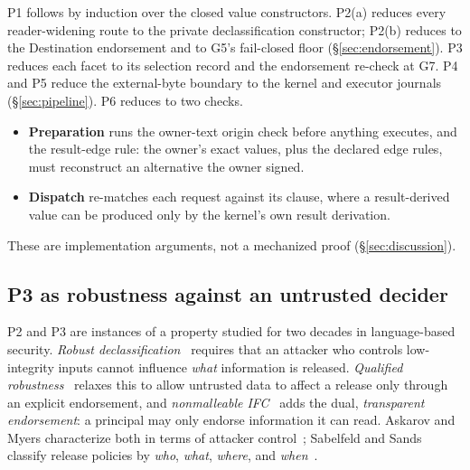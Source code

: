 \documentclass[letterpaper,twocolumn,10pt]{article}
\begin{document}
P1 follows by induction over the closed value constructors. P2(a) reduces
every reader-widening route to the private declassification constructor;
P2(b) reduces to the \textsf{Destination} endorsement and to G5's
fail-closed floor (\S\ref{sec:endorsement}).
P3 reduces each facet to its selection record and the endorsement re-check
at G7. P4 and P5 reduce the external-byte boundary to the kernel and
executor journals (\S\ref{sec:pipeline}). P6 reduces to two checks.
\begin{itemize}
\item \textbf{Preparation} runs the owner-text origin check before
  anything executes, and the result-edge rule: the owner's exact values,
  plus the declared edge rules, must reconstruct an alternative the owner
  signed.
\item \textbf{Dispatch} re-matches each request against its clause, where
  a result-derived value can be produced only by the kernel's own result
  derivation.
\end{itemize}
These are implementation arguments, not a mechanized proof
(\S\ref{sec:discussion}).

\subsection{P3 as robustness against an untrusted decider}
\label{sec:robustness}

P2 and P3 are instances of a property studied for two decades in
language-based security. \emph{Robust declassification}~\cite{zdancewic2001robust}
requires that an attacker who controls low-integrity inputs cannot
influence \emph{what} information is released. \emph{Qualified
robustness}~\cite{myers2006qualified} relaxes this to allow untrusted data to
affect a release only through an explicit endorsement, and
\emph{nonmalleable IFC}~\cite{cecchetti2017nmifc} adds the dual,
\emph{transparent endorsement}: a principal may only endorse information it
can read. Askarov and Myers characterize both in terms of attacker
control~\cite{askarov2011}; Sabelfeld and Sands classify release policies by
\emph{who}, \emph{what}, \emph{where}, and \emph{when}~\cite{sabelfeld2009declass}.
\end{document}
